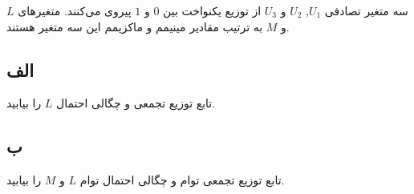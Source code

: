 سه متغیر تصادفی
$ U_1 $,
$ U_2 $
 و
$ U_3 $
 از توزیع یکنواخت بین
$ 0 $
 و
$ 1 $ 
پیروی می‌کنند. متغیرهای
$ L $ 
و
$ M $
  به ترتیب مقادیر مینیمم و ماکزیمم این سه متغیر هستند.
\subsection*{الف}
تابع توزیع تجمعی و چگالی احتمال
$ L $
 را بیابید.
\subsection*{ب}
 تابع توزیع تجمعی توام و چگالی احتمال توام
$ L $ 
و
$ M $ 
را بیابید.
